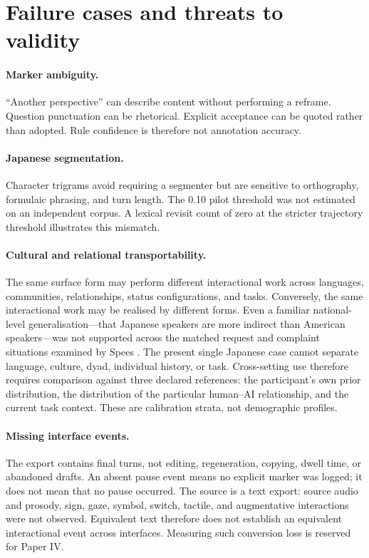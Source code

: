 \documentclass[11pt]{article}
\begin{document}
\section{Failure cases and threats to validity}

\paragraph{Marker ambiguity.}
``Another perspective'' can describe content without performing a reframe.
Question punctuation can be rhetorical. Explicit acceptance can be quoted
rather than adopted. Rule confidence is therefore not annotation accuracy.

\paragraph{Japanese segmentation.}
Character trigrams avoid requiring a segmenter but are sensitive to orthography,
formulaic phrasing, and turn length. The 0.10 pilot threshold was not estimated
on an independent corpus. A lexical revisit count of zero at the stricter
trajectory threshold illustrates this mismatch.

\paragraph{Cultural and relational transportability.}
The same surface form may perform different interactional work across
languages, communities, relationships, status configurations, and tasks.
Conversely, the same interactional work may be realised by different forms.
Even a familiar national-level generalisation---that Japanese speakers are
more indirect than American speakers---was not supported across the matched
request and complaint situations examined by Spees \citep{spees1994indirectness}.
The present single Japanese case cannot separate language, culture, dyad,
individual history, or task. Cross-setting use therefore requires comparison
against three declared references: the participant's own prior distribution,
the distribution of the particular human--AI relationship, and the current
task context. These are calibration strata, not demographic profiles.

\paragraph{Missing interface events.}
The export contains final turns, not editing, regeneration, copying, dwell time,
or abandoned drafts. An absent pause event means no explicit marker was logged;
it does not mean that no pause occurred.
The source is a text export: source audio and prosody, sign, gaze, symbol,
switch, tactile, and augmentative interactions were not observed. Equivalent
text therefore does not establish an equivalent interactional event across
interfaces. Measuring such conversion loss is reserved for Paper IV.
\end{document}
